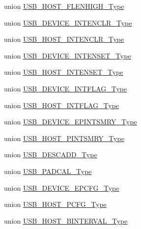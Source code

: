 \begin{DoxyCompactItemize}
\item 
union \mbox{\hyperlink{union_u_s_b___h_o_s_t___f_l_e_n_h_i_g_h___type}{U\+S\+B\+\_\+\+H\+O\+S\+T\+\_\+\+F\+L\+E\+N\+H\+I\+G\+H\+\_\+\+Type}}
\item 
union \mbox{\hyperlink{union_u_s_b___d_e_v_i_c_e___i_n_t_e_n_c_l_r___type}{U\+S\+B\+\_\+\+D\+E\+V\+I\+C\+E\+\_\+\+I\+N\+T\+E\+N\+C\+L\+R\+\_\+\+Type}}
\item 
union \mbox{\hyperlink{union_u_s_b___h_o_s_t___i_n_t_e_n_c_l_r___type}{U\+S\+B\+\_\+\+H\+O\+S\+T\+\_\+\+I\+N\+T\+E\+N\+C\+L\+R\+\_\+\+Type}}
\item 
union \mbox{\hyperlink{union_u_s_b___d_e_v_i_c_e___i_n_t_e_n_s_e_t___type}{U\+S\+B\+\_\+\+D\+E\+V\+I\+C\+E\+\_\+\+I\+N\+T\+E\+N\+S\+E\+T\+\_\+\+Type}}
\item 
union \mbox{\hyperlink{union_u_s_b___h_o_s_t___i_n_t_e_n_s_e_t___type}{U\+S\+B\+\_\+\+H\+O\+S\+T\+\_\+\+I\+N\+T\+E\+N\+S\+E\+T\+\_\+\+Type}}
\item 
union \mbox{\hyperlink{union_u_s_b___d_e_v_i_c_e___i_n_t_f_l_a_g___type}{U\+S\+B\+\_\+\+D\+E\+V\+I\+C\+E\+\_\+\+I\+N\+T\+F\+L\+A\+G\+\_\+\+Type}}
\item 
union \mbox{\hyperlink{union_u_s_b___h_o_s_t___i_n_t_f_l_a_g___type}{U\+S\+B\+\_\+\+H\+O\+S\+T\+\_\+\+I\+N\+T\+F\+L\+A\+G\+\_\+\+Type}}
\item 
union \mbox{\hyperlink{union_u_s_b___d_e_v_i_c_e___e_p_i_n_t_s_m_r_y___type}{U\+S\+B\+\_\+\+D\+E\+V\+I\+C\+E\+\_\+\+E\+P\+I\+N\+T\+S\+M\+R\+Y\+\_\+\+Type}}
\item 
union \mbox{\hyperlink{union_u_s_b___h_o_s_t___p_i_n_t_s_m_r_y___type}{U\+S\+B\+\_\+\+H\+O\+S\+T\+\_\+\+P\+I\+N\+T\+S\+M\+R\+Y\+\_\+\+Type}}
\item 
union \mbox{\hyperlink{union_u_s_b___d_e_s_c_a_d_d___type}{U\+S\+B\+\_\+\+D\+E\+S\+C\+A\+D\+D\+\_\+\+Type}}
\item 
union \mbox{\hyperlink{union_u_s_b___p_a_d_c_a_l___type}{U\+S\+B\+\_\+\+P\+A\+D\+C\+A\+L\+\_\+\+Type}}
\item 
union \mbox{\hyperlink{union_u_s_b___d_e_v_i_c_e___e_p_c_f_g___type}{U\+S\+B\+\_\+\+D\+E\+V\+I\+C\+E\+\_\+\+E\+P\+C\+F\+G\+\_\+\+Type}}
\item 
union \mbox{\hyperlink{union_u_s_b___h_o_s_t___p_c_f_g___type}{U\+S\+B\+\_\+\+H\+O\+S\+T\+\_\+\+P\+C\+F\+G\+\_\+\+Type}}
\item 
union \mbox{\hyperlink{union_u_s_b___h_o_s_t___b_i_n_t_e_r_v_a_l___type}{U\+S\+B\+\_\+\+H\+O\+S\+T\+\_\+\+B\+I\+N\+T\+E\+R\+V\+A\+L\+\_\+\+Type}}
\item 

\end{DoxyCompactItemize}
